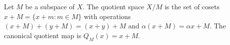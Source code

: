 Let $M$ be a subspace of $X$. The quotient space $X/M$ is the set of cosets $x+M = \{x+m : m \in M\}$ with operations $(x+M)+(y+M) = (x+y)+M$ and $\alpha(x+M) = \alpha x + M$. The canonical quotient map is $Q_M(x) = x+M$.